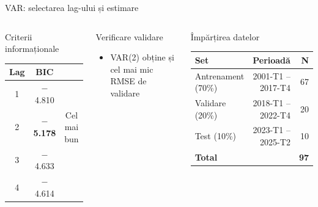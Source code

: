 \documentclass[9pt, aspectratio=169, t]{beamer}
\begin{document}
\begin{frame}{VAR: selectarea lag-ului și estimare}
    \begin{columns}[T]
        \begin{block}{Criterii informaționale}
            \begin{center}
            \begin{tabular}{ccc}
                \toprule
                \textbf{Lag} & \textbf{BIC} & \\
                \midrule
                1 & $-$4.810 & \\
                \rowcolor{Forest!20} 2 & \textbf{$-$5.178} & Cel mai bun \\
                3 & $-$4.633 & \\
                4 & $-$4.614 & \\
                \bottomrule
            \end{tabular}
            \end{center}
        \end{block}

        \vspace{0.2cm}

        \begin{exampleblock}{Verificare validare}
            \begin{itemize}\setlength{\itemsep}{0pt}
                \item VAR(2) obține și cel mai mic RMSE de validare
            \end{itemize}
        \end{exampleblock}

        \begin{block}{Împărțirea datelor}
            \begin{center}
            \begin{tabular}{lrr}
                \toprule
                \textbf{Set} & \textbf{Perioadă} & \textbf{N} \\
                \midrule
                Antrenament (70\%) & 2001-T1 -- 2017-T4 & 67 \\
                Validare (20\%) & 2018-T1 -- 2022-T4 & 20 \\
                Test (10\%) & 2023-T1 -- 2025-T2 & 10 \\
                \midrule
                \textbf{Total} & & \textbf{97} \\
                \bottomrule
            \end{tabular}
            \end{center}
        \end{block}
    \end{columns}
\end{frame}
\end{document}
